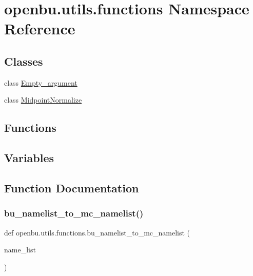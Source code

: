 \hypertarget{namespaceopenbu_1_1utils_1_1functions}{}\section{openbu.\+utils.\+functions Namespace Reference}
\label{namespaceopenbu_1_1utils_1_1functions}
\subsection*{Classes}
\begin{DoxyCompactItemize}
\item 
class \mbox{\hyperlink{classopenbu_1_1utils_1_1functions_1_1_empty__argument}{Empty\+\_\+argument}}
\item 
class \mbox{\hyperlink{classopenbu_1_1utils_1_1functions_1_1_midpoint_normalize}{Midpoint\+Normalize}}
\end{DoxyCompactItemize}
\subsection*{Functions}
\subsection*{Variables}


\subsection{Function Documentation}
\mbox{\label{namespaceopenbu_1_1utils_1_1functions_aa2980972e5b4eb76db5d01f436c861a9}} 
\subsubsection{\texorpdfstring{bu\+\_\+namelist\+\_\+to\+\_\+mc\+\_\+namelist()}{bu\_namelist\_to\_mc\_namelist()}}
{\footnotesize\ttfamily def openbu.\+utils.\+functions.\+bu\+\_\+namelist\+\_\+to\+\_\+mc\+\_\+namelist (\begin{DoxyParamCaption}\item[{}]{name\+\_\+list }\end{DoxyParamCaption})}

